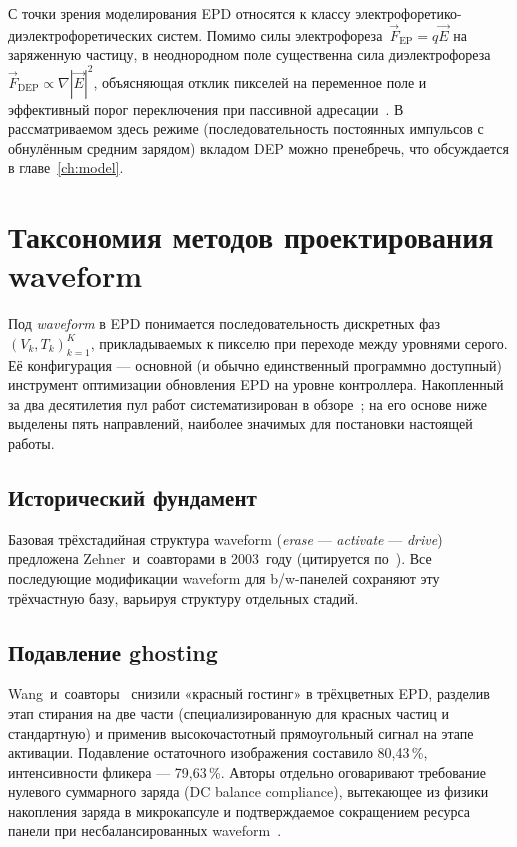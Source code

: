 С точки зрения моделирования EPD относятся к классу
электрофоретико-диэлектрофоретических систем. Помимо силы
электрофореза~$\vec{F}_{\!\text{EP}} = q \vec{E}$ на заряженную частицу, в
неоднородном поле существенна сила диэлектрофореза
$\vec{F}_{\!\text{DEP}} \propto \nabla |\vec{E}|^2$, объясняющая отклик пикселей
на переменное поле и эффективный порог переключения при пассивной
адресации~\cite{bert2003_physics}. В рассматриваемом здесь режиме
(последовательность постоянных импульсов с обнулённым средним зарядом) вкладом
DEP можно пренебречь, что обсуждается в главе~\ref{ch:model}.


\section{Таксономия методов проектирования waveform}\label{sec:taxonomy}

Под \emph{waveform} в EPD понимается последовательность дискретных фаз
$(V_k, T_k)_{k=1}^{K}$, прикладываемых к пикселю при переходе между уровнями
серого. Её конфигурация --- основной (и обычно единственный программно
доступный) инструмент оптимизации обновления EPD на уровне контроллера.
Накопленный за два десятилетия пул работ систематизирован в
обзоре~\cite{zhong2026_review}; на его основе ниже выделены пять
направлений, наиболее значимых для постановки настоящей работы.

\subsection*{Исторический фундамент}

Базовая трёхстадийная структура waveform (\emph{erase} — \emph{activate} —
\emph{drive}) предложена Zehner~и~соавторами в 2003~году (цитируется
по~\cite{kang2025_dp_waveform}). Все последующие модификации waveform для
b/w-панелей сохраняют эту трёхчастную базу, варьируя структуру отдельных стадий.

\subsection*{Подавление ghosting}

Wang~и~соавторы~\cite{wang2022_red_ghost} снизили «красный гостинг» в
трёхцветных EPD, разделив этап стирания на две части (специализированную для
красных частиц и стандартную) и применив высокочастотный прямоугольный сигнал
на этапе активации. Подавление остаточного изображения составило 80{,}43\,\%,
интенсивности фликера — 79{,}63\,\%. Авторы отдельно оговаривают
требование нулевого суммарного заряда (DC balance compliance),
вытекающее из физики накопления заряда в микрокапсуле и подтверждаемое
сокращением ресурса панели при несбалансированных
waveform~\cite{yang2021_mechanisms}.

